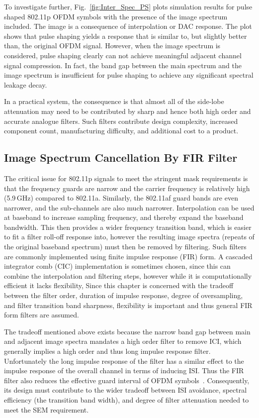 To investigate further, Fig.~\ref{fig:Inter_Spec_PS} plots simulation results for pulse shaped 802.11p OFDM symbols with the presence of the image spectrum included.
The image is a consequence of interpolation or DAC response.
The plot shows that pulse shaping yields a response that is similar to, but slightly better than, the original OFDM signal.
However, when the image spectrum is considered, pulse shaping clearly can not achieve meaningful adjacent channel signal compression.
In fact, the band gap between the main spectrum and the image spectrum is insufficient for pulse shaping to achieve any significant spectral leakage decay.

In a practical system, the consequence is that almost all of the side-lobe attenuation may need to be contributed by sharp and hence both high order and accurate analogue filters.
Such filters contribute design complexity, increased component count, manufacturing difficulty, and additional cost to a product.

\subsection{Image Spectrum Cancellation By FIR Filter}
\label{subsec:FIR}
The critical issue for 802.11p signals to meet the stringent mask requirements is that the frequency guards are narrow and the carrier frequency is relatively high (5.9\,GHz) compared to 802.11a.
Similarly, the 802.11af guard bands are even narrower, and the sub-channels are also much narrower.
Interpolation can be used at baseband to increase sampling frequency, and thereby expand the baseband bandwidth.
This then provides a wider frequency transition band, which is easier to fit a filter roll-off response into, however the resulting image spectra (repeats of the original baseband spectrum) must then be removed by filtering.
Such filters are commonly implemented using finite impulse response (FIR) form.
A cascaded integrator comb (CIC) implementation is sometimes chosen, since this can combine the interpolation and filtering steps, however while it is computationally efficient it lacks flexibility,
Since this chapter is concerned with the tradeoff between the filter order, duration of impulse response, degree of oversampling, and filter transition band sharpness, flexibility is important and thus general FIR form filters are assumed.

The tradeoff mentioned above exists because the narrow band gap between main and adjacent image spectra mandates a high order filter to remove ICI, which generally implies a high order and thus long impulse response filter.
Unfortunately the long impulse response of the filter has a similar effect to the impulse response of the overall channel in terms of inducing ISI.
Thus the FIR filter also reduces the effective guard interval of OFDM symbols~\cite{farhang2008signal}.
Consequently, its design must contribute to the wider tradeoff between ISI avoidance, spectral efficiency (the transition band width), and degree of filter attenuation needed to meet the SEM requirement.

